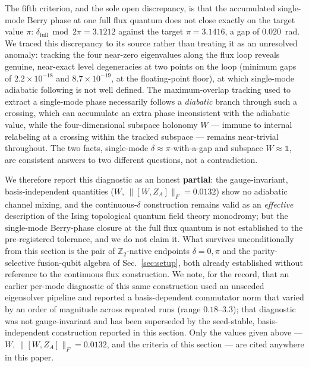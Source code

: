 \documentclass[aps,pra,twocolumn,superscriptaddress,floatfix,nofootinbib]{revtex4-2}
\begin{document}
The fifth criterion, and the sole open discrepancy, is that the
accumulated single-mode Berry phase at one full flux quantum does not
close exactly on the target value $\pi$:
$\delta_{\mathrm{full}}\bmod2\pi=3.1212$ against the target
$\pi=3.1416$, a gap of $0.020$~rad. We traced this discrepancy to its
source rather than treating it as an unresolved anomaly: tracking the
four near-zero eigenvalues along the flux loop reveals genuine,
near-exact level degeneracies at two points on the loop (minimum gaps
of $2.2\times10^{-18}$ and $8.7\times10^{-19}$, at the floating-point
floor), at which single-mode adiabatic following is not well defined.
The maximum-overlap tracking used to extract a single-mode phase
necessarily follows a \emph{diabatic} branch through such a crossing,
which can accumulate an extra phase inconsistent with the adiabatic
value, while the four-dimensional subspace holonomy $W$ --- immune to
internal relabeling at a crossing within the tracked subspace ---
remains near-trivial throughout. The two facts, single-mode
$\delta\approx\pi$-with-a-gap and subspace $W\approx\mathbb{1}$, are
consistent answers to two different questions, not a contradiction.

We therefore report this diagnostic as an honest \textbf{partial}: the
gauge-invariant, basis-independent quantities
($W$, $\lVert[W,Z_A]\rVert_F=0.0132$) show no adiabatic channel
mixing, and the continuous-$\delta$ construction remains valid as an
\emph{effective} description of the Ising topological quantum field
theory monodromy; but the single-mode Berry-phase closure at the full
flux quantum is not established to the pre-registered tolerance, and
we do not claim it. What survives unconditionally from this section is
the pair of $\mathbb{Z}_2$-native endpoints $\delta=0,\pi$ and the
parity-selective fusion-qubit algebra of Sec.~\ref{sec:setup}, both
already established without reference to the continuous flux
construction. We note, for the record, that an earlier per-mode
diagnostic of this same construction used an unseeded eigensolver
pipeline and reported a basis-dependent commutator norm that varied
by an order of magnitude across repeated runs (range
$0.18$--$3.3$); that diagnostic was not gauge-invariant and has been
superseded by the seed-stable, basis-independent construction
reported in this section. Only the values given above --- $W$,
$\lVert[W,Z_A]\rVert_F=0.0132$, and the criteria of this section ---
are cited anywhere in this paper.

\end{document}
